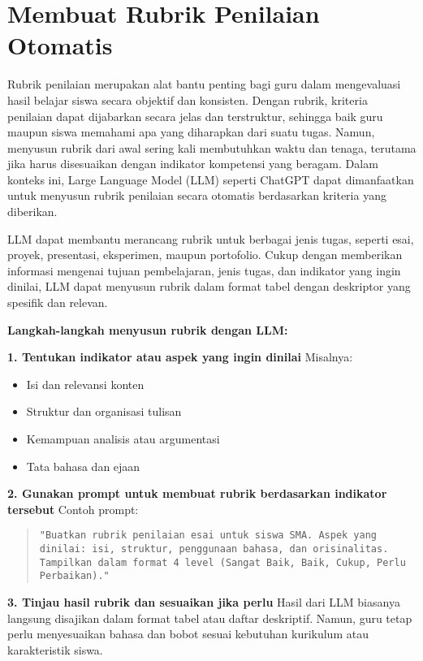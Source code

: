 \section{Membuat Rubrik Penilaian Otomatis}

Rubrik penilaian merupakan alat bantu penting bagi guru dalam mengevaluasi hasil belajar siswa secara objektif dan konsisten. Dengan rubrik, kriteria penilaian dapat dijabarkan secara jelas dan terstruktur, sehingga baik guru maupun siswa memahami apa yang diharapkan dari suatu tugas. Namun, menyusun rubrik dari awal sering kali membutuhkan waktu dan tenaga, terutama jika harus disesuaikan dengan indikator kompetensi yang beragam. Dalam konteks ini, Large Language Model (LLM) seperti ChatGPT dapat dimanfaatkan untuk menyusun rubrik penilaian secara otomatis berdasarkan kriteria yang diberikan.

LLM dapat membantu merancang rubrik untuk berbagai jenis tugas, seperti esai, proyek, presentasi, eksperimen, maupun portofolio. Cukup dengan memberikan informasi mengenai tujuan pembelajaran, jenis tugas, dan indikator yang ingin dinilai, LLM dapat menyusun rubrik dalam format tabel dengan deskriptor yang spesifik dan relevan.

\textbf{Langkah-langkah menyusun rubrik dengan LLM:}

\textbf{1. Tentukan indikator atau aspek yang ingin dinilai}  
Misalnya:
\begin{itemize}
	\item Isi dan relevansi konten
	\item Struktur dan organisasi tulisan
	\item Kemampuan analisis atau argumentasi
	\item Tata bahasa dan ejaan
\end{itemize}

\textbf{2. Gunakan prompt untuk membuat rubrik berdasarkan indikator tersebut}  
Contoh prompt:

\begin{quote}
	\centering
	\texttt{"Buatkan rubrik penilaian esai untuk siswa SMA. Aspek yang dinilai: isi, struktur, penggunaan bahasa, dan orisinalitas. Tampilkan dalam format 4 level (Sangat Baik, Baik, Cukup, Perlu Perbaikan)."}
\end{quote}

\textbf{3. Tinjau hasil rubrik dan sesuaikan jika perlu}  
Hasil dari LLM biasanya langsung disajikan dalam format tabel atau daftar deskriptif. Namun, guru tetap perlu menyesuaikan bahasa dan bobot sesuai kebutuhan kurikulum atau karakteristik siswa.

